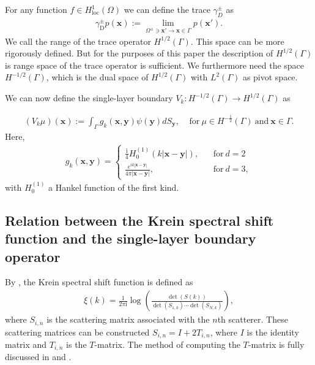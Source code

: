 For any function $f\in H_{\text{loc}}^1(\Omega)$ we can define the trace $\gamma_{D}^{\pm}$ as
\begin{align*}
    \gamma_{\text{D}}^{\pm}p(\boldsymbol{x}):=\lim_{\Omega^{\pm}\ni\boldsymbol{x'}\rightarrow\boldsymbol{x}\in\Gamma}p(\boldsymbol{x'}).
\end{align*}
We call the range of the trace operator $H^{1/2}(\Gamma)$. This space can be more rigorously defined. But for the purposes of this paper the description of $H^{1/2}(\Gamma)$ is range space of the trace operator is sufficient. We furthermore need the space $H^{-1/2}(\Gamma)$, which is the dual space of $H^{1/2}(\Gamma)$ with $L^2(\Gamma)$ as pivot space.

We can now define the single-layer boundary $V_{k}:H^{-1/2}(\Gamma)\rightarrow H^{1/2}(\Gamma)$ as

\begin{align*}
    (V_{k}\mu)(\boldsymbol{x}) := \int_{\Gamma}g_{k}(\boldsymbol{x},\boldsymbol{y})\psi(\boldsymbol{y})dS_{\boldsymbol{y}}, \ \ \ \ \ 
    \text{for}\ \mu\in H^{-\frac{1}{2}}(\Gamma) \  \text{and} \ \boldsymbol{x}\in\Gamma.
\end{align*}
Here, 
\begin{align}\label{Green's function}
    g_{k}(\boldsymbol{x},\boldsymbol{y}) = \begin{cases}
          \frac{\mathrm{i}}{4}H_{0}^{(1)}(k|\boldsymbol{x}-\boldsymbol{y}|), \ \ \ \ &\text{for} \ d = 2\\
          \frac{e^{ik|\boldsymbol{x}-\boldsymbol{y}|}}{4\pi|\boldsymbol{x} - \boldsymbol{y}|}, \ \ \ \ &\text{for} \ d = 3,
        \end{cases}
\end{align}
with $H_{0}^{(1)}$  a Hankel function of the first kind.



\subsection{Relation between the Krein spectral shift function and the single-layer boundary operator}
By \cite{hanisch2020relative}, the Krein spectral shift function is defined as 
\begin{align*}
    \xi(k) = \frac{1}{2\pi \mathrm{i}}\log\left(\frac{\det(S(k))}{\det(S_{1,k})\cdots\det(S_{N,k})}\right),
\end{align*}
where $S_{i,n}$ is the scattering matrix associated with the $n$th scatterer. These scattering matrices can be constructed  $S_{i,n} = I + 2T_{i,n}$, where 
$I$ is the identity matrix and $T_{i,n}$ is the $T$-matrix. The method of computing the $T$-matrix is fully discussed in \cite{waterman1969new} and 
\cite{ganesh2008far}.

